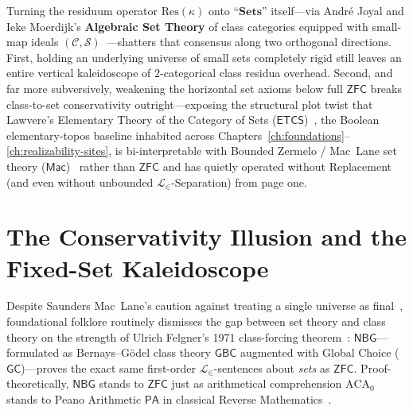 Turning the residuum operator $\mathrm{Res}(\kappa)$ onto ``$\mathbf{Sets}$'' itself---via Andr\'e Joyal and Ieke Moerdijk's \textbf{Algebraic Set Theory} of class categories equipped with small-map ideals $(\mathcal{C}, \mathcal{S})$~\cite{JoyalMoerdijk95}---shatters that consensus along two orthogonal directions. First, holding an underlying universe of small sets completely rigid still leaves an entire vertical kaleidoscope of $2$-categorical class residua overhead. Second, and far more subversively, weakening the horizontal set axioms below full $\mathsf{ZFC}$ breaks class-to-set conservativity outright---exposing the structural plot twist that Lawvere's Elementary Theory of the Category of Sets ($\mathsf{ETCS}$)~\cite{Lawvere64}, the Boolean elementary-topos baseline inhabited across Chapters~\ref{ch:foundations}--\ref{ch:realizability-sites}, is bi-interpretable with Bounded Zermelo / Mac~Lane set theory ($\mathsf{Mac}$)~\cite{Cole73,Mitchell72,Osius74} rather than $\mathsf{ZFC}$ and has quietly operated without Replacement (and even without unbounded $\mathcal{L}_\in$-Separation) from page one.

\section{\texorpdfstring{The Conservativity Illusion and the Fixed-Set Kaleidoscope}{The Conservativity Illusion and the Fixed-Set Kaleidoscope}}\label{sec:conservativity-kaleidoscope}

Despite Saunders Mac~Lane's caution against treating a single universe as final~\cite[Ch.~I, \S 6]{MacLane98}, foundational folklore routinely dismisses the gap between set theory and class theory on the strength of Ulrich Felgner's 1971 class-forcing theorem~\cite{Felgner71}: $\mathsf{NBG}$---formulated as Bernays--G\"odel class theory $\mathsf{GBC}$ augmented with Global Choice ($\mathsf{GC}$)---proves the exact same first-order $\mathcal{L}_\in$-sentences about \emph{sets} as $\mathsf{ZFC}$. Proof-theoretically, $\mathsf{NBG}$ stands to $\mathsf{ZFC}$ just as arithmetical comprehension $\mathrm{ACA}_0$ stands to Peano Arithmetic $\mathsf{PA}$ in classical Reverse Mathematics~\cite{Simpson09}.


